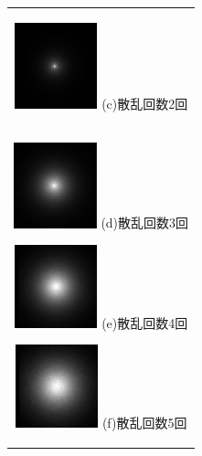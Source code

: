\documentclass[dvipdfmx,autodetect-engine,twocolumn,10pt]{jsarticle}%
\begin{document}
\begin{figure}[htbp]
\begin{center}
\begin{tabular}{c}
        \begin{minipage}{0.33\hsize}
          \begin{center}
            \includegraphics[clip, width=2.4cm]{./file/monte_simu_2.eps}
            \hspace{1.6cm} \small{(c)散乱回数2回} \vspace{0.2cm}
          \end{center}
        \end{minipage}
        \\
        \begin{minipage}{0.33\hsize}
          \begin{center}
            \includegraphics[clip, width=2.4cm]{./file/monte_simu_3.eps}
            \hspace{1.6cm} \small{(d)散乱回数3回} \vspace{0.2cm}
          \end{center}
        \end{minipage}

        \begin{minipage}{0.33\hsize}
          \begin{center}
            \includegraphics[clip, width=2.4cm]{./file/monte_simu_4.eps}
            \hspace{1.6cm} \small{(e)散乱回数4回} \vspace{0.2cm}
          \end{center}
        \end{minipage}

        \begin{minipage}{0.33\hsize}
          \begin{center}
            \includegraphics[clip, width=2.4cm]{./file/monte_simu_5.eps}
            \hspace{1.6cm} \small{(f)散乱回数5回} \vspace{0.2cm}
          \end{center}
        \end{minipage}


\end{tabular}
\end{center}
\end{figure}
\end{document}
